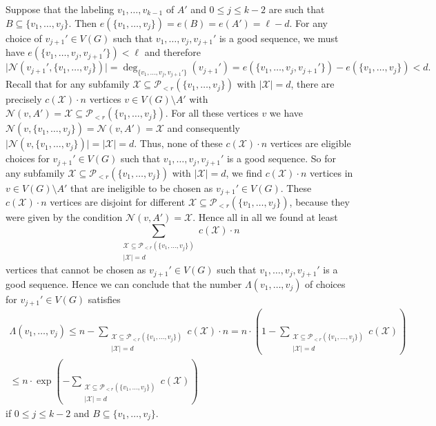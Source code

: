Suppose that the labeling $v_1,\dots,v_{k-1}$ of $A'$ and $0\leq j\leq k-2$ are such that $B\subseteq \lbrace v_1,\dots,v_j\rbrace$. Then $e(\lbrace v_1,\dots,v_j\rbrace)=e(B)=e(A')=\ell-d$. For any choice of $v_{j+1}'\in V(G)$ such that $v_1,\dots,v_j,v_{j+1}'$ is a good sequence, we must have $e(\lbrace v_1,\dots,v_j, v_{j+1}'\rbrace)<\ell$ and therefore
\[\vert \mathcal{N}(v_{j+1}',\lbrace v_1,\dots,v_j\rbrace)\vert=\deg_{\lbrace v_1,\dots,v_j,v_{j+1}'\rbrace}(v_{j+1}')=e(\lbrace v_1,\dots,v_j, v_{j+1}'\rbrace)-e(\lbrace v_1,\dots,v_j\rbrace)<d.\]
Recall that for any subfamily $\mathcal{X}\subseteq \mathcal{P}\!_{<r}(\lbrace v_1,\dots,v_j\rbrace)$ with $\vert \mathcal{X}\vert=d$, there are precisely $c(\mathcal{X})\cdot n$ vertices $v\in V(G)\setminus A'$ with $\mathcal{N}(v,A')=\mathcal{X}\subseteq \mathcal{P}\!_{<r}(\lbrace v_1,\dots,v_j\rbrace)$. For all these vertices $v$ we have $\mathcal{N}(v, \lbrace v_1,\dots,v_j\rbrace)=\mathcal{N}(v,A')=\mathcal{X}$ and consequently $\vert \mathcal{N}(v, \lbrace v_1,\dots,v_j\rbrace)\vert=\vert \mathcal{X}\vert=d$. Thus, none of these $c(\mathcal{X})\cdot n$ vertices are eligible choices for $v_{j+1}'\in V(G)$ such that $v_1,\dots,v_j,v_{j+1}'$ is a good sequence. So for any subfamily $\mathcal{X}\subseteq \mathcal{P}\!_{<r}(\lbrace v_1,\dots,v_j\rbrace)$ with $\vert \mathcal{X}\vert=d$, we find $c(\mathcal{X})\cdot n$ vertices in $v\in V(G)\setminus A'$ that are ineligible to be chosen as $v_{j+1}'\in V(G)$. These $c(\mathcal{X})\cdot n$ vertices are disjoint for different $\mathcal{X}\subseteq \mathcal{P}\!_{<r}(\lbrace v_1,\dots,v_j\rbrace)$, because they were given by the condition $\mathcal{N}(v,A')=\mathcal{X}$. Hence all in all we found at least
\[\sum_{\substack{\mathcal{X}\subseteq \mathcal{P}\!_{<r}(\lbrace v_1,\dots,v_j\rbrace)\\\vert \mathcal{X}\vert=d}}c(\mathcal{X})\cdot n\]
vertices that cannot be chosen as $v_{j+1}'\in V(G)$ such that $v_1,\dots,v_j,v_{j+1}'$ is a good sequence. Hence we can conclude that the number $\Lambda(v_1,\dots,v_{j})$ of choices for $v_{j+1}'\in V(G)$ satisfies
\begin{multline*}
\Lambda(v_1,\dots,v_{j})\leq n-\sum_{\substack{\mathcal{X}\subseteq \mathcal{P}\!_{<r}(\lbrace v_1,\dots,v_j\rbrace)\\\vert \mathcal{X}\vert=d}}c(\mathcal{X})\cdot n=n\cdot \left(1-\sum_{\substack{\mathcal{X}\subseteq \mathcal{P}\!_{<r}(\lbrace v_1,\dots,v_j\rbrace)\\\vert \mathcal{X}\vert=d}}c(\mathcal{X})\right)\\
\leq n\cdot \exp\left(-\sum_{\substack{\mathcal{X}\subseteq \mathcal{P}\!_{<r}(\lbrace v_1,\dots,v_j\rbrace)\\\vert \mathcal{X}\vert=d}}c(\mathcal{X})\right)
\end{multline*}
if $0\leq j\leq k-2$ and $B\subseteq \lbrace v_1,\dots,v_j\rbrace$.


